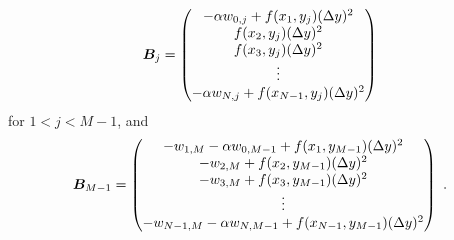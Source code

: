 \[
\bm{B}_j = \begin{pmatrix}
-\alpha w_{0,j} + f(x_1,y_j)(\Delta{y})^2\\
f(x_2,y_j)(\Delta{y})^2 \\
f(x_3,y_j)(\Delta{y})^2 \\
\vdots \\
-\alpha w_{N,j} + f(x_{N-1},y_j)(\Delta{y})^2
\end{pmatrix}
\]
for $1 <j < M-1$, and
\[\bm{B}_{M-1} = \begin{pmatrix}
-w_{1,M} - \alpha w_{0,M-1} + f(x_1,y_{M-1})(\Delta{y})^2\\
-w_{2,M} + f(x_2,y_{M-1})(\Delta{y})^2 \\
-w_{3,M} + f(x_3,y_{M-1})(\Delta{y})^2 \\
\vdots \\
-w_{N-1,M} -\alpha w_{N,M-1} + f(x_{N-1},y_{M-1})(\Delta{y})^2
\end{pmatrix} \ .
\]

